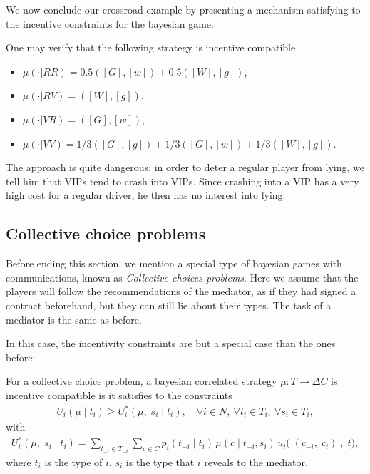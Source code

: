 \begin{example}


We now conclude our crossroad example by presenting a mechanism satisfying to the incentive constraints for the bayesian game.

One may verify that the following strategy is incentive compatible
\begin{itemize}
\item $\mu(\cdot | RR) = 0.5([G], [w]) + 0.5([W], [g])$,
\item $\mu(\cdot | RV) = ([W], [g])$,
\item $\mu(\cdot | VR) = ([G], [w])$,
\item $\mu(\cdot | VV) = 1/3([G],[g]) + 1/3([G], [w]) + 1/3([W], [g])$.
\end{itemize}


The approach is quite dangerous: in order to deter a regular player from lying, we tell him that VIPs tend to crash into VIPs. Since crashing into a VIP has a very high cost for a regular driver, he then has no interest into lying.

\end{example}



\subsection{Collective choice problems}
\label{ch5:subs:coll}
Before ending this section, we mention a special type of bayesian games with communications, known as \emph{Collective choices problems}.  Here we assume that the players will follow the recommendations of the mediator, as if they had signed a contract beforehand, but they can still lie about their types. The task of a mediator is the same as before.

In this case, the incentivity constraints are but a special case than the ones before:
\begin{definition}
For a collective choice problem, a bayesian correlated strategy $\mu : T \rightarrow \Delta C$ is incentive compatible is it satisfies to the constraints
\begin{align*}
	U_i(\mu \; | \; t_i) \geq U_i^*(\mu,  \; s_i \; | \; t_i), \quad \forall i \in N, \ \forall t_i \in T_i, \ \forall s_i \in T_i, 
\end{align*}
with 
\begin{align*}
	U_i^*(\mu, \;  s_i \; | \; t_i) = \sum_{t_{-i} \in T_{-i}} \sum_{c \in C} p_i(t_{-i} \; | \; t_i) \, \mu(c \; | \; t_{-i}, s_i) \, u_i\big( \; (c_{-i}, \; c_i )\;, \; t \big),
\end{align*}
where $t_i$ is the type of $i$, $s_i$ is the type that $i$ reveals to the mediator.
\end{definition}



